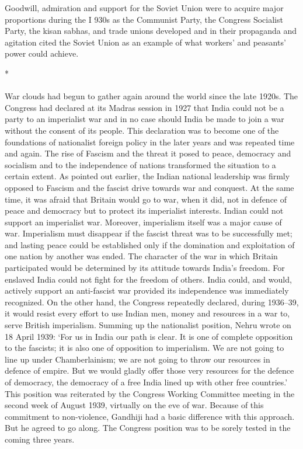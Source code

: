 \begin{multicols}{2}
Goodwill, admiration and support for the Soviet Union were to acquire major proportions during the I 930s as the Communist Party, the Congress Socialist Party, the kisan sabhas, and trade unions developed and in their propaganda and agitation cited the Soviet Union as an example of what workers' and peasants' power could achieve.

\begin{center}*\end{center}

\paragraph*{}

War clouds had begun to gather again around the world since the late 1920s. The Congress had declared at its Madras session in 1927 that India could not be a party to an imperialist war and in no case should India be made to join a war without the consent of its people. This declaration was to become one of the foundations of nationalist foreign policy in the later years and was repeated time and again. The rise of Fascism and the threat it posed to peace, democracy and socialism and to the independence of nations transformed the situation to a certain extent. As pointed out earlier, the Indian national leadership was firmly opposed to Fascism and the fascist drive towards war and conquest. At the same time, it was afraid that Britain would go to war, when it did, not in defence of peace and democracy but to protect its imperialist interests. Indian could not support an imperialist war. Moreover, imperialism itself was a major cause of war. Imperialism must disappear if the fascist threat was to be successfully met; and lasting peace could be established only if the domination and exploitation of one nation by another was ended. The character of the war in which Britain participated would be determined by its attitude towards India's freedom. For enslaved India could not fight for the freedom of others. India could, and would, actively support an anti-fascist war provided its independence was immediately recognized. On the other hand, the Congress repeatedly declared, during 1936--39, it would resist every effort to use Indian men, money and resources in a war to, serve British imperialism. Summing up the nationalist position, Nehru wrote on 18 April 1939: `For us in India our path is clear. It is one of complete opposition to the fascists; it is also one of opposition to imperialism. We are not going to line up under Chamberlainism; we are not going to throw our resources in defence of empire. But we would gladly offer those very resources for the defence of democracy, the democracy of a free India lined up with other free countries.' This position was reiterated by the Congress Working Committee meeting in the second week of August 1939, virtually on the eve of war. Because of this commitment to non-violence, Gandhiji had a basic difference with this approach. But he agreed to go along. The Congress position was to be sorely tested in the coming three years.
\end{multicols}